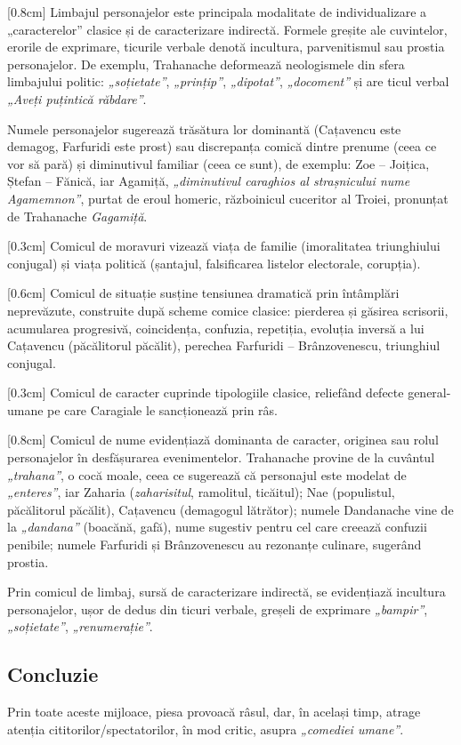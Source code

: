 \documentclass[
12pt,                        %
a4paper                      %
]{article}
\begin{document}
[0.8cm]
Limbajul personajelor este principala modalitate de individualizare a „caracterelor” clasice și de caracterizare indirectă. Formele greșite ale cuvintelor, erorile de exprimare, ticurile verbale denotă incultura, parvenitismul sau prostia personajelor. De exemplu, Trahanache deformează neologismele din sfera limbajului politic: \textit{„soțietate”}, \textit{„prințip”}, \textit{„dipotat”}, \textit{„docoment”} și are ticul verbal \textit{„Aveți puțintică răbdare”}.

Numele personajelor sugerează trăsătura lor dominantă (Cațavencu este demagog, Farfuridi este prost) sau discrepanța comică dintre prenume (ceea ce vor să pară) și diminutivul familiar (ceea ce sunt), de exemplu: Zoe -- Joițica, Ștefan -- Fănică, iar Agamiță, \textit{„diminutivul caraghios al strașnicului nume Agamemnon”}, purtat de eroul homeric, războinicul cuceritor al Troiei, pronunțat de Trahanache \textit{Gagamiță}.

[0.3cm]
Comicul de moravuri vizează viața de familie (imoralitatea triunghiului conjugal) și viața politică (șantajul, falsificarea listelor electorale, corupția).

[0.6cm]
Comicul de situație susține tensiunea dramatică prin întâmplări neprevăzute, construite după scheme comice clasice: pierderea și găsirea scrisorii, acumularea progresivă, coincidența, confuzia, repetiția, evoluția inversă a lui Cațavencu (păcălitorul păcălit), perechea Farfuridi -- Brânzovenescu, triunghiul conjugal.

[0.3cm]
Comicul de caracter cuprinde tipologiile clasice, reliefând defecte general-umane pe care Caragiale le sancționează prin râs.

[0.8cm]
Comicul de nume evidențiază dominanta de caracter, originea sau rolul personajelor în desfășurarea evenimentelor. Trahanache provine de la cuvântul \textit{„trahana”}, o cocă moale, ceea ce sugerează că personajul este modelat de \textit{„enteres”}, iar Zaharia (\textit{zaharisitul}, ramolitul, ticăitul); Nae (populistul, păcălitorul păcălit), Cațavencu (demagogul lătrător); numele Dandanache vine de la \textit{„dandana”} (boacănă, gafă), nume sugestiv pentru cel care creează confuzii penibile; numele Farfuridi și Brânzovenescu au rezonanțe culinare, sugerând prostia.

Prin comicul de limbaj, sursă de caracterizare indirectă, se evidențiază incultura personajelor, ușor de dedus din ticuri verbale, greșeli de exprimare \textit{„bampir”}, \textit{„soțietate”}, \textit{„renumerație”}.

\subsection{Concluzie}

Prin toate aceste mijloace, piesa provoacă râsul, dar, în același timp, atrage atenția cititorilor/spectatorilor, în mod critic, asupra \textit{„comediei umane”}.
\end{document}
